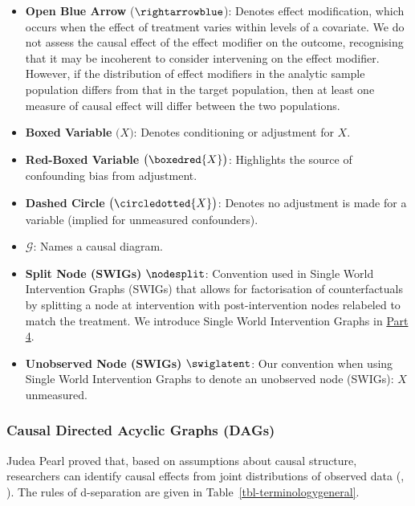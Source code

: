 \documentclass[
  single column]{article}
\begin{document}
\begin{itemize}
\item
  \textbf{Open Blue Arrow} (\(\rightarrowblue\)): Denotes effect
  modification, which occurs when the effect of treatment varies within
  levels of a covariate. We do not assess the causal effect of the
  effect modifier on the outcome, recognising that it may be incoherent
  to consider intervening on the effect modifier. However, if the
  distribution of effect modifiers in the analytic sample population
  differs from that in the target population, then at least one measure
  of causal effect will differ between the two populations.
\item
  \textbf{Boxed Variable} \(\big(\boxed{X}\big)\): Denotes conditioning
  or adjustment for \(X\).
\item
  \textbf{Red-Boxed Variable} \(\big(\boxedred{X}\big)\): Highlights the
  source of confounding bias from adjustment.
\item
  \textbf{Dashed Circle} \(\big(\circledotted{X}\big)\): Denotes no
  adjustment is made for a variable (implied for unmeasured
  confounders).
\item
  \textbf{\(\mathcal{G}\)}: Names a causal diagram.
\item
  \textbf{Split Node (SWIGs)} \(\nodesplit\): Convention used in Single
  World Intervention Graphs (SWIGs) that allows for factorisation of
  counterfactuals by splitting a node at intervention with
  post-intervention nodes relabeled to match the treatment. We introduce
  Single World Intervention Graphs in \hyperref[id-sec-4]{Part 4}.
\item
  \textbf{Unobserved Node (SWIGs)} \(\swiglatent\): Our convention when
  using Single World Intervention Graphs to denote an unobserved node
  (SWIGs): \(X\) unmeasured.
\end{itemize}

\subsubsection{Causal Directed Acyclic Graphs
(DAGs)}\label{causal-directed-acyclic-graphs-dags}

Judea Pearl proved that, based on assumptions about causal structure,
researchers can identify causal effects from joint distributions of
observed data (,
). The rules of d-separation are given in
Table~\ref{tbl-terminologygeneral}.

\begin{table}

\caption{\label{tbl-terminologygeneral}}

\centering{

\captionsetup{labelsep=none}

\terminologydirectedgraph

}

\end{table}%
\end{document}
